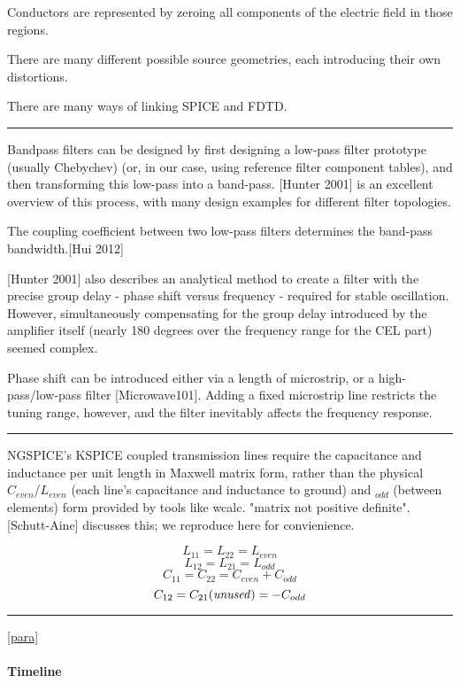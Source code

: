 \documentclass[fleqn,10pt]{article}
\begin{document}
\begin{multicols}{1}
Conductors are represented by zeroing all components of the electric field in those regions. 

There are many different possible source geometries, each introducing their own distortions.

There are many ways of linking SPICE and FDTD. 

\rule{\linewidth}{0.2pt}

Bandpass filters can be designed by first designing a low-pass filter prototype (usually Chebychev) (or, in our case, using reference filter component tables), and then transforming this low-pass into a band-pass. [Hunter 2001] is an excellent overview of this process, with many design examples for different filter topologies. 

The coupling coefficient between two low-pass filters determines the band-pass bandwidth.[Hui 2012]

[Hunter 2001] also describes an analytical method to create a filter with the precise group delay - phase shift versus frequency - required for stable oscillation. However, simultaneously compensating for the group delay introduced by the amplifier itself (nearly 180 degrees over the frequency range for the CEL part) seemed complex.

Phase shift can be introduced either via a length of microstrip, or a high-pass/low-pass filter [Microwave101]. Adding a fixed microstrip line restricts the tuning range, however, and the filter inevitably affects the frequency response.  

\rule{\linewidth}{0.2pt}

NGSPICE's KSPICE coupled transmission lines require the capacitance and inductance per unit length in Maxwell matrix form, rather than the physical $C_{even}$/$L_{even}$ (each line's capacitance and inductance to ground) and $_{odd}$ (between elements) form provided by tools like wcalc. "matrix not positive definite". [Schutt-Aine] discusses this; we reproduce here for convienience.

\[ L_{11} = L_{22} = L_{even}  \]
\[ L_{12} = L_{21} = L_{odd}  \]
\[ C_{11} = C_{22} = C_{even}+C_{odd}  \]
\[ C_{12} = C_{21} {\it{(unused)}} = -C_{odd}  \]

\rule{\linewidth}{0.2pt}



\label{para}
\ref{para}

\paragraph{Timeline}


\end{multicols}
\end{document}
